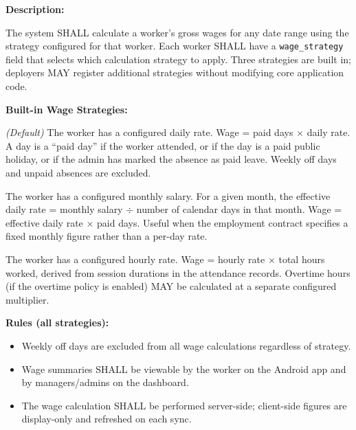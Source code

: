 \documentclass[12pt, a4paper]{article}
\newcommand{\srsfield}[1]{\noindent\textbf{#1:}\par}
\begin{document}
\srsfield{Description}
The system SHALL calculate a worker's gross wages for any date range
using the strategy configured for that worker. Each worker SHALL have a
\texttt{wage\_strategy} field that selects which calculation strategy to
apply. Three strategies are built in; deployers MAY register additional
strategies without modifying core application code.

\srsfield{Built-in Wage Strategies}

\begin{description}[leftmargin=4cm, style=nextline]
    \item[\texttt{DAILY\_FIXED}]
        \textit{(Default)} The worker has a configured daily rate.
        Wage = paid days $\times$ daily rate. A day is a ``paid day'' if
        the worker attended, or if the day is a paid public holiday, or
        if the admin has marked the absence as paid leave. Weekly off
        days and unpaid absences are excluded.

    \item[\texttt{MONTHLY\_DIVIDED}]
        The worker has a configured monthly salary. For a given month,
        the effective daily rate = monthly salary $\div$ number of
        calendar days in that month. Wage = effective daily rate
        $\times$ paid days. Useful when the employment contract specifies
        a fixed monthly figure rather than a per-day rate.

    \item[\texttt{HOURLY}]
        The worker has a configured hourly rate. Wage = hourly rate
        $\times$ total hours worked, derived from session durations in
        the attendance records. Overtime hours (if the overtime policy
        is enabled) MAY be calculated at a separate configured multiplier.
\end{description}

\srsfield{Rules (all strategies)}
\begin{itemize}
    \item Weekly off days are excluded from all wage calculations
          regardless of strategy.
    \item Wage summaries SHALL be viewable by the worker on the Android
          app and by managers/admins on the dashboard.
    \item The wage calculation SHALL be performed server-side;
          client-side figures are display-only and refreshed on each sync.
\end{itemize}
\end{document}
